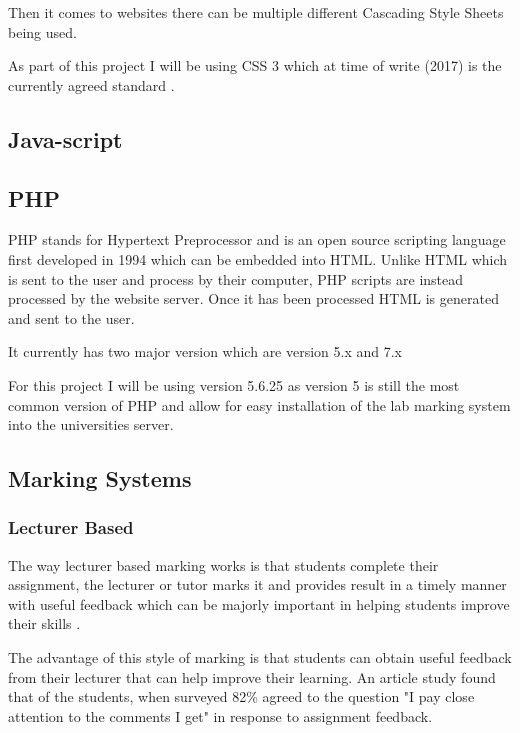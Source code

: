 \documentclass[12pt]{article}  %
\begin{document}
 

Then it comes to websites there can be multiple different Cascading Style Sheets being used.  

As part of this project I will be using CSS 3 which at time of write (2017) is the currently agreed standard \cite{noauthor_css_nodate}.


\subsection{Java-script}

\subsection{PHP}
\label{sec:php}

PHP stands for Hypertext Preprocessor and is an open source scripting language first developed in 1994 \cite{noauthor_php:_nodate} which can be embedded into HTML. Unlike HTML which is sent to the user and process by their computer, PHP scripts are instead processed by the website server. Once it has been processed HTML is generated and sent to the user. 

It currently has two major version which are version 5.x and 7.x


For this project I will be using version 5.6.25 as version 5 is still the most common version of PHP and allow for easy installation of the lab marking system into the universities server.



\subsection{Marking Systems}

\subsubsection{Lecturer Based}
The way lecturer based marking works is that students complete their assignment, the lecturer or tutor marks it and provides result in a timely manner with useful feedback which can be majorly important in helping students improve their skills  \cite{tang_investigating_2011}.

The advantage of this style of marking is that students can obtain useful feedback from their lecturer that can help improve their learning.  An article study \cite{higgins_conscientious_2002} found that of the students, when surveyed 82\% agreed to the question "I pay close attention to the comments I get" in response to assignment feedback.
\end{document}

